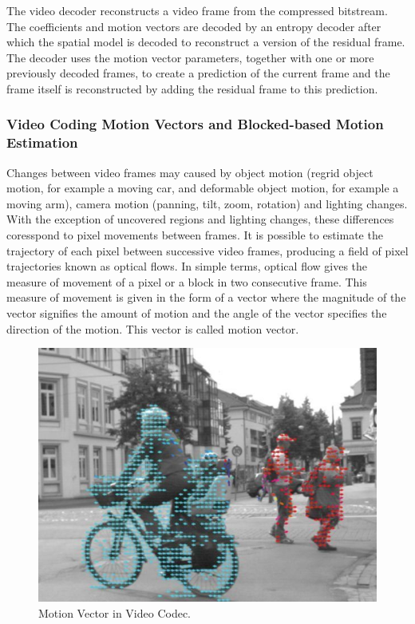 The video decoder reconstructs a video frame from the compressed bitstream. The coefficients and motion vectors are decoded by an entropy decoder after which the spatial model is decoded to reconstruct a version of the residual frame. The decoder uses the motion vector parameters, together with one or more previously decoded frames, to create a prediction of the current frame and the frame itself is reconstructed by adding the residual frame to this prediction.
\subsubsection{Video Coding Motion Vectors and Blocked-based Motion Estimation}
	Changes between video frames may caused by object motion (regrid object motion, for example a moving car, and deformable object motion, for example a moving arm), camera motion (panning, tilt, zoom, rotation) and lighting changes. With the exception of uncovered regions and lighting changes, these differences coresspond to pixel movements between frames. It is possible to estimate the trajectory of each pixel between successive video frames, producing a field of pixel trajectories known as optical flows. In simple terms, optical flow gives the measure of movement of a pixel or a block in two consecutive frame. This measure of movement is given in the form of a vector where the magnitude of the vector signifies the amount of motion and the angle of the vector specifies the direction of the motion. This vector is called motion vector. 
\begin{figure}
\centering
 \includegraphics[width=0.8\linewidth]{Figures/opticalflow.jpeg}
 \caption{Motion Vector in Video Codec.}
 \label{fig:opticalflow}
\end{figure}

